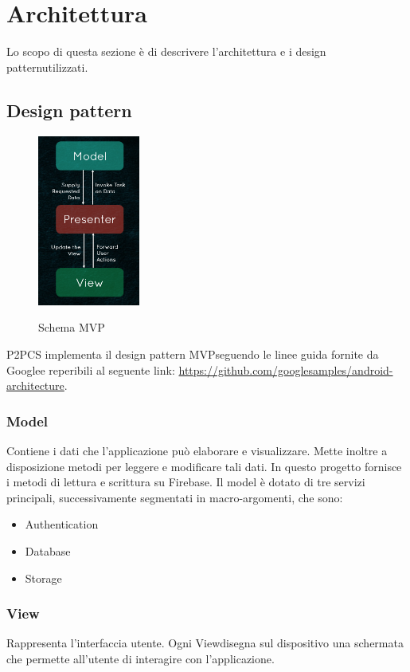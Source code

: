 \section{Architettura}
Lo scopo di questa sezione è di descrivere l'architettura e i design pattern\glosp utilizzati.
\subsection{Design pattern}
\begin{figure}[H]
	\centering
	\includegraphics[width=0.3\textwidth]
	{res/images/mvp.png}\\
	\caption{Schema MVP}
	\label{Schema MVP}
\end{figure}
P2PCS implementa il design pattern MVP\glosp seguendo le linee guida fornite da Google\glosp e reperibili al seguente link: \url{https://github.com/googlesamples/android-architecture}.
\newline
\subsubsection{Model}
Contiene i dati che l’applicazione può elaborare e visualizzare. Mette inoltre a disposizione metodi per leggere e modificare tali dati.
In questo progetto fornisce i metodi di lettura e scrittura su Firebase\glo.
Il model è dotato di tre servizi principali, successivamente segmentati in macro-argomenti, che sono:
\begin{itemize}
	\item Authentication
	\item Database
	\item Storage
\end{itemize}
\subsubsection{View}
Rappresenta l’interfaccia utente. Ogni View\glosp disegna sul dispositivo una schermata che permette all’utente di interagire con l’applicazione.
